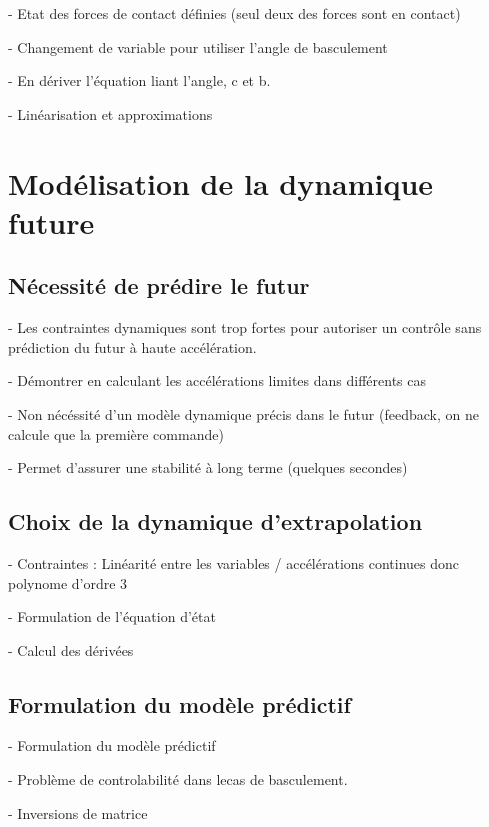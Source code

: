		- Etat des forces de contact définies (seul deux des forces sont en contact)

		- Changement de variable pour utiliser l'angle de basculement

		- En dériver l'équation liant l'angle, c et b. 
		
		- Linéarisation et approximations

	\section{Modélisation de la dynamique future}
		\subsection{Nécessité de prédire le futur}

		- Les contraintes dynamiques sont trop fortes pour autoriser un contrôle sans prédiction du futur à haute accélération.

		- Démontrer en calculant les accélérations limites dans différents cas

		- Non nécéssité d'un modèle dynamique précis dans le futur (feedback, on ne calcule que la première commande)

		- Permet d'assurer une stabilité à long terme (quelques secondes)

		\subsection{Choix de la dynamique d'extrapolation}

		- Contraintes : Linéarité entre les variables / accélérations continues donc polynome d'ordre 3

		- Formulation de l'équation d'état

		- Calcul des dérivées

		\subsection{Formulation du modèle prédictif}

		- Formulation du modèle prédictif

		- Problème de controlabilité dans lecas de basculement.

		- Inversions de matrice